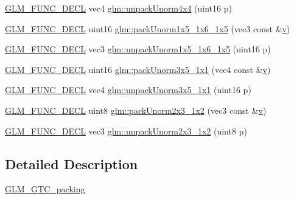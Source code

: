 \begin{DoxyCompactItemize}
\item 
\mbox{\hyperlink{setup_8hpp_ab2d052de21a70539923e9bcbf6e83a51}{G\+L\+M\+\_\+\+F\+U\+N\+C\+\_\+\+D\+E\+CL}} vec4 \mbox{\hyperlink{group__gtc__packing_ga38a0a518d53e15a9481c31dc1e574a40}{glm\+::unpack\+Unorm4x4}} (uint16 p)
\item 
\mbox{\hyperlink{setup_8hpp_ab2d052de21a70539923e9bcbf6e83a51}{G\+L\+M\+\_\+\+F\+U\+N\+C\+\_\+\+D\+E\+CL}} uint16 \mbox{\hyperlink{group__gtc__packing_ga0fcb493167d540aca105d11df5c55503}{glm\+::pack\+Unorm1x5\+\_\+1x6\+\_\+1x5}} (vec3 const \&\mbox{\hyperlink{glad_8h_a14cfbe2fc2234f5504618905b69d1e06}{v}})
\item 
\mbox{\hyperlink{setup_8hpp_ab2d052de21a70539923e9bcbf6e83a51}{G\+L\+M\+\_\+\+F\+U\+N\+C\+\_\+\+D\+E\+CL}} vec3 \mbox{\hyperlink{group__gtc__packing_ga6804d0525daf68bcac226f46fbb3b24e}{glm\+::unpack\+Unorm1x5\+\_\+1x6\+\_\+1x5}} (uint16 p)
\item 
\mbox{\hyperlink{setup_8hpp_ab2d052de21a70539923e9bcbf6e83a51}{G\+L\+M\+\_\+\+F\+U\+N\+C\+\_\+\+D\+E\+CL}} uint16 \mbox{\hyperlink{group__gtc__packing_ga1b41375846ed66768da78ca299d8d010}{glm\+::pack\+Unorm3x5\+\_\+1x1}} (vec4 const \&\mbox{\hyperlink{glad_8h_a14cfbe2fc2234f5504618905b69d1e06}{v}})
\item 
\mbox{\hyperlink{setup_8hpp_ab2d052de21a70539923e9bcbf6e83a51}{G\+L\+M\+\_\+\+F\+U\+N\+C\+\_\+\+D\+E\+CL}} vec4 \mbox{\hyperlink{group__gtc__packing_gaab3b476e8f320670717fd518f350ce28}{glm\+::unpack\+Unorm3x5\+\_\+1x1}} (uint16 p)
\item 
\mbox{\hyperlink{setup_8hpp_ab2d052de21a70539923e9bcbf6e83a51}{G\+L\+M\+\_\+\+F\+U\+N\+C\+\_\+\+D\+E\+CL}} uint8 \mbox{\hyperlink{group__gtc__packing_ga0acca4eb99c300fe2edeef7ebd8fa08b}{glm\+::pack\+Unorm2x3\+\_\+1x2}} (vec3 const \&\mbox{\hyperlink{glad_8h_a14cfbe2fc2234f5504618905b69d1e06}{v}})
\item 
\mbox{\hyperlink{setup_8hpp_ab2d052de21a70539923e9bcbf6e83a51}{G\+L\+M\+\_\+\+F\+U\+N\+C\+\_\+\+D\+E\+CL}} vec3 \mbox{\hyperlink{group__gtc__packing_gaeeacc5275329100c50fe8fc0871eb423}{glm\+::unpack\+Unorm2x3\+\_\+1x2}} (uint8 p)
\end{DoxyCompactItemize}


\subsection{Detailed Description}
\mbox{\hyperlink{group__gtc__packing}{G\+L\+M\+\_\+\+G\+T\+C\+\_\+packing}} 